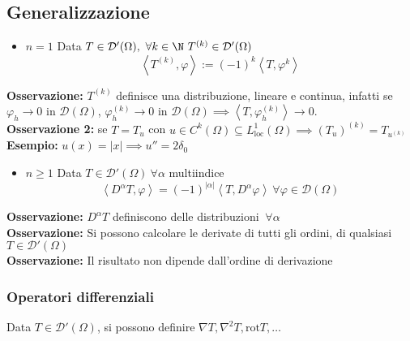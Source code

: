 \subsection{Generalizzazione }
\begin{itemize}
	\item $n=1$ Data $T\in \mathcal D'(\Omega),\ \forall k\in \N\ T^{(k)}\in \mathcal D'(\Omega)$
		\[\left<T^{(k)},\varphi \right>:= (-1)^k\left<T,\varphi^{k} \right>  \]
\end{itemize}
\textbf{Osservazione:} $T^{(k)}$ definisce una distribuzione, lineare e continua, infatti se $\varphi_h\to 0\text{ in }\mathcal D(\Omega)$, $\varphi_h^{(k)}\to 0\text{ in }\mathcal D(\Omega)\implies \left<T,\varphi_h^{(k)} \right> \to 0$.\\
\textbf{Osservazione 2:} se $T=T_u$ con $u\in C^k(\Omega)\subseteq  L^1_{\text{loc}}(\Omega)\implies (T_u)^{\left( k \right) }=T_{u^{(k)}}$\\
\textbf{Esempio: }$u(x)=|x|\implies u''=2\delta_0$
\\\divider
\begin{itemize}
	\item $n\ge 1$ Data $T\in \mathcal D'(\Omega)\ \forall \alpha$ multiindice 
		\[\left<D^\alpha T,\varphi \right> =(-1)^{|\alpha|}\left<T,D^{\alpha}\varphi \right> \ \forall \varphi\in \mathcal D(\Omega)\]

\end{itemize}
\textbf{Osservazione: }$D^\alpha T$ definiscono delle distribuzioni $\ \forall \alpha$ 
\\\textbf{Osservazione: }Si possono calcolare le derivate di tutti gli ordini, di qualsiasi $T\in \mathcal D'(\Omega)$ 
\\\textbf{Osservazione:} Il risultato non dipende dall'ordine di derivazione
\subsubsection{Operatori differenziali}
Data $T\in \mathcal D'(\Omega)$, si possono definire $\nabla T,\nabla^2 T,\text{rot}T,\ldots$ 
